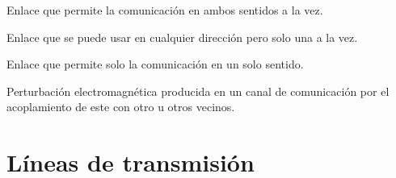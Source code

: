 \documentclass[
	11pt, %
	fleqn, %
	a4paper, %
]{LegrandOrangeBook}
\begin{document}
\begin{vocabulary}
Enlace que permite la comunicación en ambos sentidos a la vez.
\end{vocabulary}
\begin{vocabulary}
Enlace que se puede usar en cualquier dirección pero solo una a la vez.
\end{vocabulary}
\begin{vocabulary}[Simplex]
Enlace que permite solo la comunicación en un solo sentido.
\end{vocabulary}
\begin{vocabulary}[Diafonía]
Perturbación electromagnética producida en un canal de comunicación por el acoplamiento de este con otro u otros vecinos.
\end{vocabulary}
\part{Líneas de transmisión}

\newpage
\end{document}
